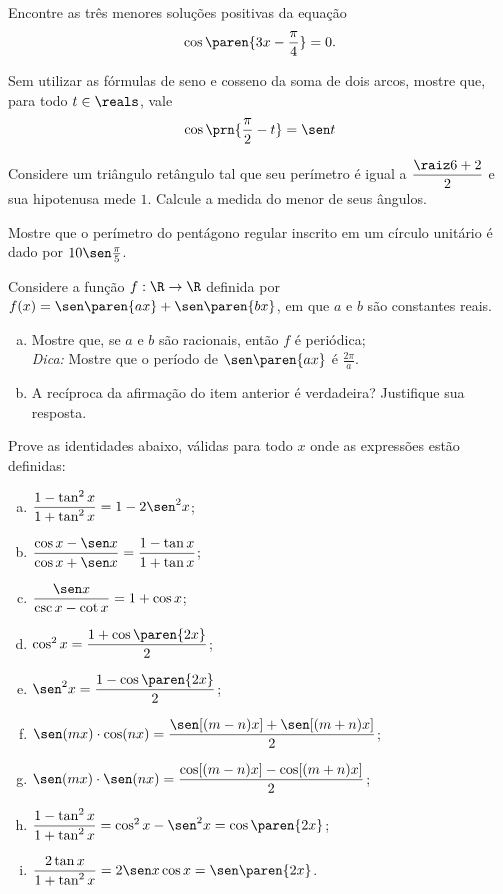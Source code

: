 \begin{exercise}
    Encontre as três menores soluções positivas da equação $$\cos
\paren{3x - \frac {\pi} 4} = 0.$$
\end{exercise}

\begin{exercise}
  Sem utilizar as fórmulas de seno e cosseno da soma de dois arcos,
  mostre que, para todo $t\in\reals$, vale \[\cos\prn{\frac \pi 2-t}=\sen t\]
\end{exercise}

\begin{exercise}
  Considere um triângulo retângulo tal que seu perímetro é igual a $\dfrac{\raiz 6 + 2}{2}$ e sua hipotenusa mede $1$. Calcule a medida do menor de seus ângulos.
\end{exercise}

\begin{exercise}
    Mostre que o perímetro do pentágono regular inscrito em um
círculo unitário é dado por $10\sen \frac {\pi} 5$.
\end{exercise}

\begin{exercise}
    Considere a função $f: \R \to \R$ definida por $f(x) = \sen
\paren{ax}+\sen \paren{bx}$, em que $a$ e $b$ são constantes reais.
\begin{enumerate}[a)]
  \item Mostre que, se $a$ e $b$ são racionais, então $f$ é
  periódica;\\
  \emph{Dica:} Mostre que o período de $\sen \paren{ax}$ é $\frac
  {2\pi} a$.
  \item A recíproca da afirmação do item anterior é verdadeira?
  Justifique sua resposta.
\end{enumerate}
\end{exercise}

\begin{exercise}
    Prove as identidades abaixo, válidas para todo $x$ onde as
expressões estão definidas:
\begin{enumerate}[a)]
  \item $\dfrac{1-\tan^2 x}{1+\tan^2 x} = 1 - 2\sen^2 x$;
  \item $\dfrac{\cos x - \sen x}{\cos x + \sen x} = \dfrac{1 - \tan x}{1+\tan
  x}$;
  \item $\dfrac{\sen x}{\csc x - \cot x} = 1+ \cos x$;
  \item $\cos^2 x = \dfrac {1+\cos \paren{2x}} 2$;
  \item $\sen^2 x = \dfrac {1-\cos \paren{2x}} 2$;
  \item $\sen(mx)\cdot\cos(nx)=\dfrac{\sen[(m-n)x]+\sen[(m+n)x]}{2}$;
  \item $\sen(mx)\cdot\sen(nx)=\dfrac{\cos[(m-n)x]-\cos[(m+n)x]}{2}$;
  \item $\dfrac{1-\tan^2 x}{1+\tan^2 x} = \cos^2 x - \sen^2 x = \cos \paren{2x}$;
  \item $\dfrac{2\tan x}{1+\tan^2 x} = 2\sen x \cos x= \sen\paren{2x}$.
\end{enumerate}
\end{exercise}

